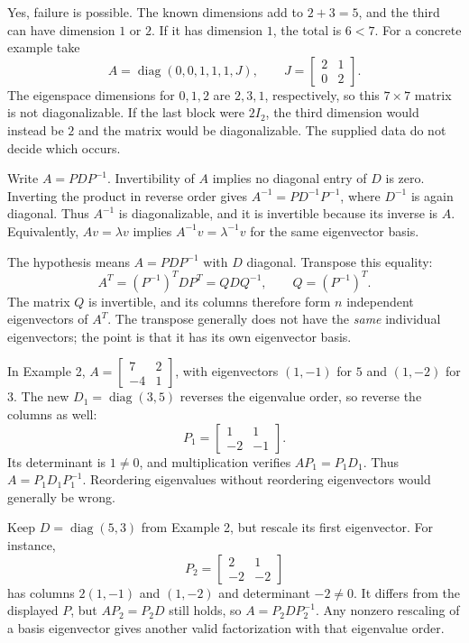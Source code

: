 Yes, failure is possible. The known dimensions add to $2+3=5$, and the third can have dimension $1$ or $2$. If it has dimension $1$, the total is $6<7$. For a concrete example take
\[
A=\operatorname{diag}(0,0,1,1,1,J),\qquad
J=\begin{bmatrix}2&1\\0&2\end{bmatrix}.
\]
The eigenspace dimensions for $0,1,2$ are $2,3,1$, respectively, so this $7\times7$ matrix is not diagonalizable. If the last block were $2I_2$, the third dimension would instead be $2$ and the matrix would be diagonalizable. The supplied data do not decide which occurs.

Write $A=PDP^{-1}$. Invertibility of $A$ implies no diagonal entry of $D$ is zero. Inverting the product in reverse order gives $A^{-1}=PD^{-1}P^{-1}$, where $D^{-1}$ is again diagonal. Thus $A^{-1}$ is diagonalizable, and it is invertible because its inverse is $A$. Equivalently, $Av=\lambda v$ implies $A^{-1}v=\lambda^{-1}v$ for the same eigenvector basis.

The hypothesis means $A=PDP^{-1}$ with $D$ diagonal. Transpose this equality:
\[
A^T=(P^{-1})^TDP^T=QDQ^{-1},\qquad Q=(P^{-1})^T.
\]
The matrix $Q$ is invertible, and its columns therefore form $n$ independent eigenvectors of $A^T$. The transpose generally does not have the \emph{same} individual eigenvectors; the point is that it has its own eigenvector basis.

In Example 2, $A=\left[\begin{smallmatrix}7&2\\-4&1\end{smallmatrix}\right]$, with eigenvectors $(1,-1)$ for $5$ and $(1,-2)$ for $3$. The new $D_1=\operatorname{diag}(3,5)$ reverses the eigenvalue order, so reverse the columns as well:
\[
P_1=\begin{bmatrix}1&1\\-2&-1\end{bmatrix}.
\]
Its determinant is $1\ne0$, and multiplication verifies $AP_1=P_1D_1$. Thus $A=P_1D_1P_1^{-1}$. Reordering eigenvalues without reordering eigenvectors would generally be wrong.

Keep $D=\operatorname{diag}(5,3)$ from Example 2, but rescale its first eigenvector. For instance,
\[
P_2=\begin{bmatrix}2&1\\-2&-2\end{bmatrix}
\]
has columns $2(1,-1)$ and $(1,-2)$ and determinant $-2\ne0$. It differs from the displayed $P$, but $AP_2=P_2D$ still holds, so $A=P_2DP_2^{-1}$. Any nonzero rescaling of a basis eigenvector gives another valid factorization with that eigenvalue order.

